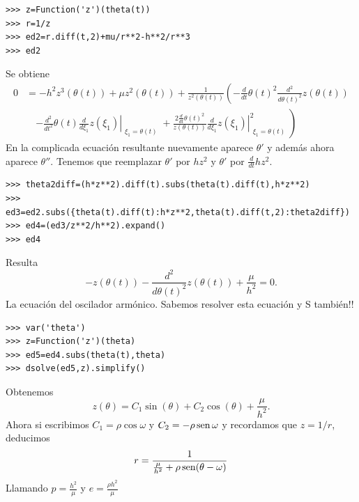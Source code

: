 \begin{lstlisting}
>>> z=Function('z')(theta(t))
>>> r=1/z
>>> ed2=r.diff(t,2)+mu/r**2-h**2/r**3
>>> ed2
\end{lstlisting}
Se obtiene
\[
\begin{split}
 0&=- h^{2} z^{3}{\left (\theta{\left (t \right )} \right )} + \mu z^{2}{\left (\theta{\left (t \right )} \right )} + \frac{1}{z^{2}{\left (\theta{\left (t \right )} \right )}} \left(- \frac{d}{d t} \theta{\left (t \right )}^{2} \frac{d^{2}}{d \theta{\left (t \right )}^{2}}  z{\left (\theta{\left (t \right )} \right )}\right.\\
 &\quad\left.- \frac{d^{2}}{d t^{2}}  \theta{\left (t \right )} \left. \frac{d}{d \xi_{1}} z{\left (\xi_{1} \right )} \right|_{\substack{ \xi_{1}=\theta{\left (t \right )} }}+ \frac{2 \frac{d}{d t} \theta{\left (t \right )}^{2}}{z{\left (\theta{\left (t \right )} \right )}} \left. \frac{d}{d \xi_{1}} z{\left (\xi_{1} \right )} \right|_{\substack{ \xi_{1}=\theta{\left (t \right )} }}^{2}\right)
\end{split}
\]
En la complicada ecuación resultante nuevamente aparece $\theta'$ y además ahora aparece $\theta''$. Tenemos que reemplazar
$\theta'$ por $hz^2$ y $\theta'$ por $\tfrac{d}{dt}hz^2$.
\begin{lstlisting}
>>> theta2diff=(h*z**2).diff(t).subs(theta(t).diff(t),h*z**2)
>>> ed3=ed2.subs({theta(t).diff(t):h*z**2,theta(t).diff(t,2):theta2diff})
>>> ed4=(ed3/z**2/h**2).expand()
>>> ed4
\end{lstlisting}
Resulta
\[- z{\left (\theta{\left (t \right )} \right )} - \frac{d^{2}}{d \theta{\left (t \right )}^{2}}  z{\left (\theta{\left (t \right )} \right )} + \frac{\mu}{h^{2}}=0.
\]
La ecuación del oscilador armónico. Sabemos resolver esta ecuación y S también!!
\begin{lstlisting}
>>> var('theta')
>>> z=Function('z')(theta)
>>> ed5=ed4.subs(theta(t),theta)
>>> dsolve(ed5,z).simplify()
\end{lstlisting}
Obtenemos
\[
z{\left (\theta \right )} = C_{1} \sin{\left (\theta \right )} + C_{2} \cos{\left (\theta \right )} + \frac{\mu}{h^{2}}.
\]
Ahora si escribimos $C_1=\rho\cos\omega$ y $C_2=-\rho\operatorname{sen}\omega$ y recordamos que $z=1/r$, deducimos
\[r=\frac{1}{\frac{\mu}{h^2}+\rho\operatorname{sen}(\theta-\omega)}\]
Llamando $p=\tfrac{h^2}{\mu}$ y $e=\tfrac{\rho h^2}{\mu}$

